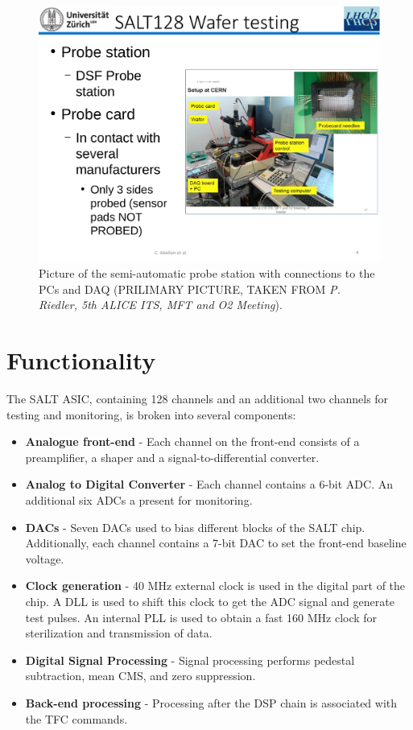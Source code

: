 \documentclass{lhcbnote}
\begin{document}
\begin{figure}
\centering
\includegraphics[width=\textwidth]{figures/probe_station}
\caption{Picture of the semi-automatic probe station with connections to the PCs and DAQ (PRILIMARY PICTURE, TAKEN FROM \textit{P. Riedler, 5th ALICE ITS, MFT and O2 Meeting}).}
\label{fig:probe_station}
\end{figure}


\section{Functionality}

The SALT ASIC, containing 128 channels and an additional two channels for testing and monitoring, is broken into several components:
\begin{itemize}
\item \textbf{Analogue front-end} - Each channel on the front-end consists of a preamplifier, a shaper and a signal-to-differential converter.
\item \textbf{Analog to Digital Converter} - Each channel contains a 6-bit ADC. An additional six ADCs a present for monitoring.
\item \textbf{DACs} - Seven DACs used to bias different blocks of the SALT chip. Additionally, each channel contains a 7-bit DAC to set the front-end baseline voltage.
\item \textbf{Clock generation} - 40 MHz external clock is used in the digital part of the chip. A DLL is used to shift this clock to get the ADC signal and generate test pulses. An internal PLL is used to obtain a fast 160 MHz clock for sterilization and transmission of data.
\item \textbf{Digital Signal Processing} - Signal processing performs pedestal subtraction, mean CMS, and zero suppression.
\item \textbf{Back-end processing} - Processing after the DSP chain is associated with the TFC commands.
\end{itemize}
\end{document}
